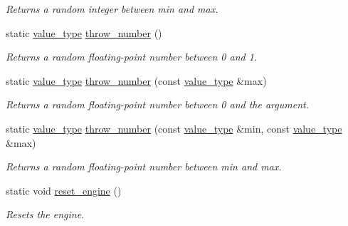 \begin{DoxyCompactItemize}
\begin{DoxyCompactList}\small\item\em Returns a random integer between min and max. \end{DoxyCompactList}\item 
\hypertarget{a00471_a7146f8145374f9875c1f9b79ac8ba2c1}{}static \hyperlink{a00471_a9294408b4bf4d469d2cb1682e10225a8}{value\+\_\+type} \hyperlink{a00471_a7146f8145374f9875c1f9b79ac8ba2c1}{throw\+\_\+number} ()\label{a00471_a7146f8145374f9875c1f9b79ac8ba2c1}

\begin{DoxyCompactList}\small\item\em Returns a random floating-\/point number between 0 and 1. \end{DoxyCompactList}\item 
\hypertarget{a00471_ad007496e6b3f252263fb5a7471eb5565}{}static \hyperlink{a00471_a9294408b4bf4d469d2cb1682e10225a8}{value\+\_\+type} \hyperlink{a00471_ad007496e6b3f252263fb5a7471eb5565}{throw\+\_\+number} (const \hyperlink{a00471_a9294408b4bf4d469d2cb1682e10225a8}{value\+\_\+type} \&max)\label{a00471_ad007496e6b3f252263fb5a7471eb5565}

\begin{DoxyCompactList}\small\item\em Returns a random floating-\/point number between 0 and the argument. \end{DoxyCompactList}\item 
\hypertarget{a00471_af68d5d4d26c15b15912d4187f0f34ce8}{}static \hyperlink{a00471_a9294408b4bf4d469d2cb1682e10225a8}{value\+\_\+type} \hyperlink{a00471_af68d5d4d26c15b15912d4187f0f34ce8}{throw\+\_\+number} (const \hyperlink{a00471_a9294408b4bf4d469d2cb1682e10225a8}{value\+\_\+type} \&min, const \hyperlink{a00471_a9294408b4bf4d469d2cb1682e10225a8}{value\+\_\+type} \&max)\label{a00471_af68d5d4d26c15b15912d4187f0f34ce8}

\begin{DoxyCompactList}\small\item\em Returns a random floating-\/point number between min and max. \end{DoxyCompactList}\item 
\hypertarget{a00471_a778b7c62cba3d0daa7f84de402829073}{}static void \hyperlink{a00471_a778b7c62cba3d0daa7f84de402829073}{reset\+\_\+engine} ()\label{a00471_a778b7c62cba3d0daa7f84de402829073}

\begin{DoxyCompactList}\small\item\em Resets the engine. \end{DoxyCompactList}\end{DoxyCompactItemize}
